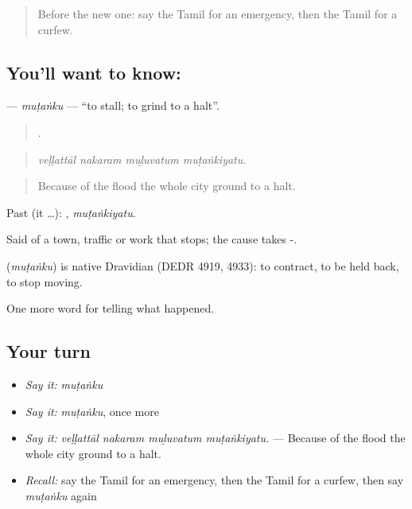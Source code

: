 \label{lesson:TA-C300-mutanku}



\begin{quote}
Before the new one: say the Tamil for an emergency, then the Tamil for a curfew.
\end{quote}

\subsection*{You'll want to know: }
\textbf{} — \emph{muṭaṅku} — \textquotedblleft{}to stall; to grind to a halt\textquotedblright{}.

\begin{quote}
   .
\end{quote}

\begin{quote}
\emph{veḷḷattāl nakaram muḻuvatum muṭaṅkiyatu.}
\end{quote}

\begin{quote}
Because of the flood the whole city ground to a halt.
\end{quote}

Past (it …): , \emph{muṭaṅkiyatu}.

Said of a town, traffic or work that stops; the cause takes -.

\begin{cousinweb}
\textbf{} (\emph{muṭaṅku}) is native Dravidian (DEDR 4919, 4933): to contract, to be held back, to stop moving.
\end{cousinweb}

\begin{grammarlens}[title={What you've built}]
One more word for telling what happened.
\end{grammarlens}

\subsection*{Your turn}
\begin{itemize}
\raggedright
  \item \emph{Say it:} \emph{muṭaṅku}
  \item \emph{Say it:} \emph{muṭaṅku}, once more
  \item \emph{Say it:} \emph{veḷḷattāl nakaram muḻuvatum muṭaṅkiyatu.} — Because of the flood the whole city ground to a halt.
  \item \emph{Recall:} say the Tamil for an emergency, then the Tamil for a curfew, then say \emph{muṭaṅku} again
\end{itemize}

